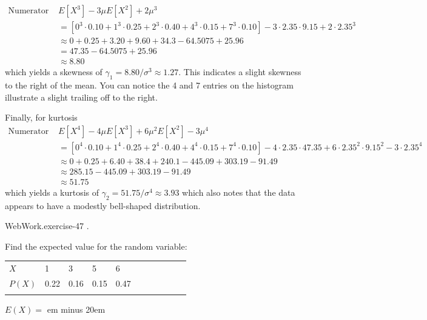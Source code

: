 \documentclass[10pt,]{book}
\newcommand{\fillin}[1]{\leavevmode\leaders\vrule height -1.2pt depth 1.5pt \hskip #1em minus #1em \null}
\numberwithin{equation}{section}
\newcommand{\hrulemedium}{\noalign{\hrule height 0.07em}}
\begin{document}
\begin{align*}
\text{Numerator = } & E[X^3] - 3 \mu E[X^2] + 2\mu^3\\
& = \left [ 0^3 \cdot 0.10 + 1^3 \cdot 0.25 + 2^3 \cdot 0.40 + 4^3 \cdot 0.15 + 7^3 \cdot 0.10 \right ] - 3 \cdot 2.35 \cdot 9.15 + 2 \cdot 2.35^3\\
& \approx 0 + 0.25 + 3.20 + 9.60 + 34.3 - 64.5075 + 25.96\\
& = 47.35 - 64.5075 + 25.96\\
& \approx 8.80
\end{align*}
which yields a skewness of \(\gamma_1 = 8.80 / \sigma^3 \approx 1.27 \). This indicates a slight skewness to the right of the mean. You can notice the 4 and 7 entries on the histogram illustrate a slight trailing off to the right.%
\par
\hypertarget{p-735}{}%
Finally, for kurtosis%
\begin{align*}
\text{Numerator = } & E[X^4] - 4 \mu E[X^3] + 6 \mu^2 E[X^2] - 3\mu^4\\
& = \left [ 0^4 \cdot 0.10 + 1^4 \cdot 0.25 + 2^4 \cdot 0.40 + 4^4 \cdot 0.15 + 7^4 \cdot 0.10 \right ] - 4 \cdot 2.35 \cdot 47.35 + 6 \cdot 2.35^2 \cdot 9.15^2 - 3 \cdot 2.35^4\\
& \approx 0 + 0.25 + 6.40 + 38.4 + 240.1 - 445.09 + 303.19 - 91.49\\
& \approx 285.15 - 445.09 + 303.19 - 91.49\\
& \approx 51.75
\end{align*}
which yields a kurtosis of \(\gamma_2 = 51.75 / \sigma^4 \approx 3.93\) which also notes that the data appears to have a modestly bell-shaped distribution.%
\par
\hypertarget{p-736}{}%
\begin{inlineexercise}{WebWork.}{exercise-47}%
\hypertarget{p-737}{}%
.%
\par\medskip
\hypertarget{p-738}{}%
Find the expected value for the random variable:%
\begin{sidebyside}{1}{0}{0}{0}%
\begin{sbspanel}{1}%
{\centering%
\begin{tabular}{BlBlBlBlBlB}\hrulemedium
\(X\)&1&3&5&6\tabularnewline\hrulemedium
\(P(X)\)&0.22&0.16&0.15&0.47\tabularnewline\hrulemedium
\end{tabular}
\par}
\end{sbspanel}%
\end{sidebyside}%
\par
\hypertarget{p-739}{}%
\(E(X) =\)  \fillin{20}%
\end{inlineexercise}
\end{document}
